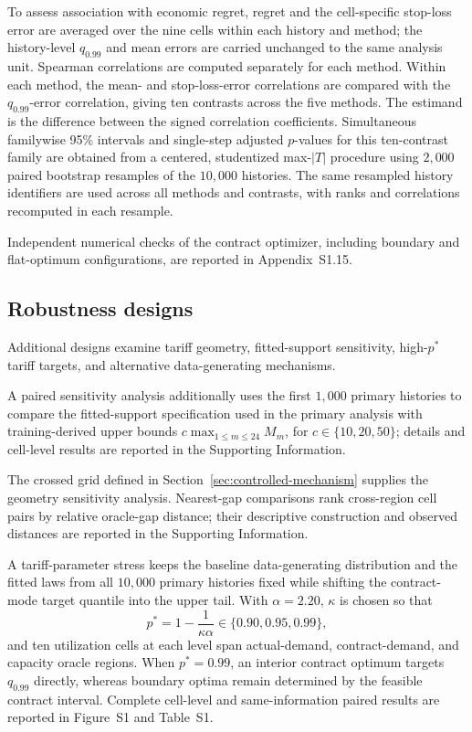 \documentclass[Times1COL]{WileyNJDv5}
\begin{document}
To assess association with economic regret, regret and the cell-specific
stop-loss error are averaged over the nine cells within each history and
method; the history-level $q_{0.99}$ and mean errors are carried
unchanged to the same analysis unit. Spearman correlations are computed
separately for each method. Within each method, the mean- and
stop-loss-error correlations are compared with the $q_{0.99}$-error
correlation, giving ten contrasts across the five methods. The estimand
is the difference between the signed correlation coefficients.
Simultaneous familywise 95\% intervals and single-step adjusted
$p$-values for this ten-contrast family are obtained from a centered,
studentized max-$|T|$ procedure using $2{,}000$ paired bootstrap
resamples of the $10{,}000$ histories. The same resampled history
identifiers are used across all methods and contrasts, with ranks and
correlations recomputed in each resample.

Independent numerical checks of the contract optimizer, including
boundary and flat-optimum configurations, are reported in
Appendix~S1.15.

\subsection{Robustness designs}
\label{sec:robustness-designs}

Additional designs examine tariff geometry, fitted-support sensitivity,
high-$p^\ast$ tariff targets, and alternative data-generating mechanisms.

A paired sensitivity analysis additionally uses the first $1{,}000$
primary histories to compare the fitted-support specification used in the
primary analysis with training-derived upper bounds
$c\max_{1\leq m\leq24} M_m$, for $c\in\{10,20,50\}$; details and
cell-level results are reported in the Supporting Information.

The crossed grid defined in Section~\ref{sec:controlled-mechanism} supplies the geometry sensitivity analysis. Nearest-gap comparisons
rank cross-region cell pairs by relative oracle-gap distance; their
descriptive construction and observed distances are reported in the
Supporting Information.

A tariff-parameter stress keeps the baseline data-generating
distribution and the fitted laws from all $10{,}000$ primary histories
fixed while shifting the contract-mode target quantile into the upper
tail. With $\alpha=2.20$, $\kappa$ is chosen so that
\[
p^\ast
=
1-\frac{1}{\kappa\alpha}
\in
\{0.90,0.95,0.99\},
\]
and ten utilization cells at each level span actual-demand,
contract-demand, and capacity oracle regions. When $p^\ast=0.99$, an
interior contract optimum targets $q_{0.99}$ directly, whereas boundary
optima remain determined by the feasible contract interval. Complete
cell-level and same-information paired results are reported in
Figure~S1 and Table~S1.
\end{document}

